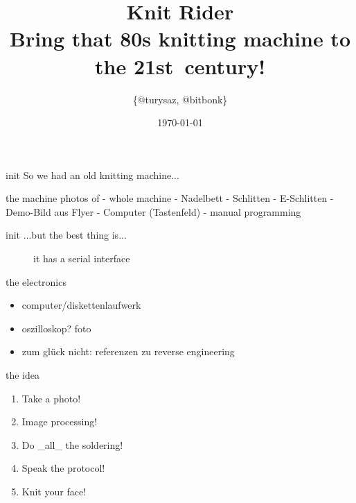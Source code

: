 


\author{\{@turysaz, @bitbonk\}}
\title{\Huge{Knit Rider}\\
    \large{Bring that 80s knitting machine to the \mbox{21st century}!}
}

\date{\today{}}



\maketitle

\begin{frame}{init}
    So we had an old knitting machine...
\end{frame}


\begin{frame}{the machine}
photos of
- whole machine
- Nadelbett
- Schlitten
- E-Schlitten
- Demo-Bild aus Flyer
- Computer (Tastenfeld)
- manual programming
\end{frame}


\begin{frame}{init}
    ...but the best thing is...\pause
    \begin{figure}
        \caption{it has a serial interface }
    \end{figure}
\end{frame}


\begin{frame}{the electronics}
    \begin{itemize}
        \item computer/diskettenlaufwerk
        \item oszilloskop? foto
        \item zum glück nicht: referenzen zu reverse engineering
    \end{itemize}
\end{frame}


\begin{frame}{the idea}
    \begin{enumerate}[<+->]
        \item Take a photo!
        \item Image processing!
        \item Do \_all\_ the soldering!
        \item Speak the protocol!
        \item Knit your face!
    \end{enumerate}
\end{frame}


